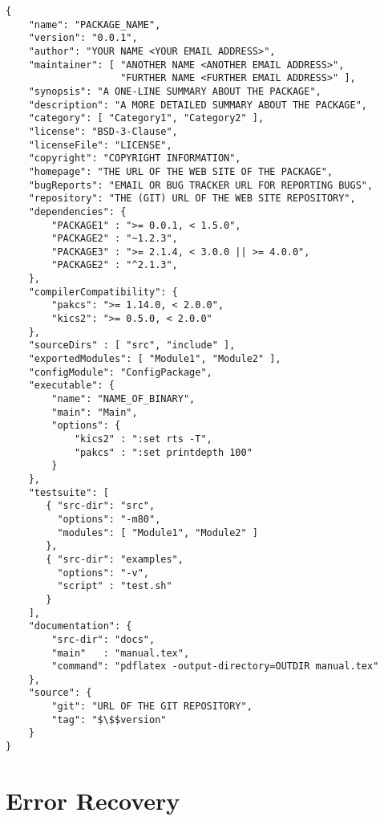\documentclass[11pt]{article}
\begin{document}
\begin{lstlisting}
{
    "name": "PACKAGE_NAME",
    "version": "0.0.1",
    "author": "YOUR NAME <YOUR EMAIL ADDRESS>",
    "maintainer": [ "ANOTHER NAME <ANOTHER EMAIL ADDRESS>",
                    "FURTHER NAME <FURTHER EMAIL ADDRESS>" ],
    "synopsis": "A ONE-LINE SUMMARY ABOUT THE PACKAGE",
    "description": "A MORE DETAILED SUMMARY ABOUT THE PACKAGE",
    "category": [ "Category1", "Category2" ],
    "license": "BSD-3-Clause",
    "licenseFile": "LICENSE",
    "copyright": "COPYRIGHT INFORMATION",
    "homepage": "THE URL OF THE WEB SITE OF THE PACKAGE",
    "bugReports": "EMAIL OR BUG TRACKER URL FOR REPORTING BUGS",
    "repository": "THE (GIT) URL OF THE WEB SITE REPOSITORY",
    "dependencies": {
        "PACKAGE1" : ">= 0.0.1, < 1.5.0",
        "PACKAGE2" : "~1.2.3",
        "PACKAGE3" : ">= 2.1.4, < 3.0.0 || >= 4.0.0",
        "PACKAGE2" : "^2.1.3",
    },
    "compilerCompatibility": {
        "pakcs": ">= 1.14.0, < 2.0.0",
        "kics2": ">= 0.5.0, < 2.0.0"
    },
    "sourceDirs" : [ "src", "include" ],
    "exportedModules": [ "Module1", "Module2" ],
    "configModule": "ConfigPackage",
    "executable": {
        "name": "NAME_OF_BINARY",
        "main": "Main",
        "options": {
            "kics2" : ":set rts -T",
            "pakcs" : ":set printdepth 100"
        }
    },
    "testsuite": [
       { "src-dir": "src",
         "options": "-m80",
         "modules": [ "Module1", "Module2" ]
       },
       { "src-dir": "examples",
         "options": "-v",
         "script" : "test.sh"
       }
    ],
    "documentation": {
        "src-dir": "docs",
        "main"   : "manual.tex",
        "command": "pdflatex -output-directory=OUTDIR manual.tex"
    },
    "source": {
        "git": "URL OF THE GIT REPOSITORY",
        "tag": "$\$$version"
    }
}
\end{lstlisting}


\clearpage

\section{Error Recovery}
\label{sec:recovery}
\end{document}
